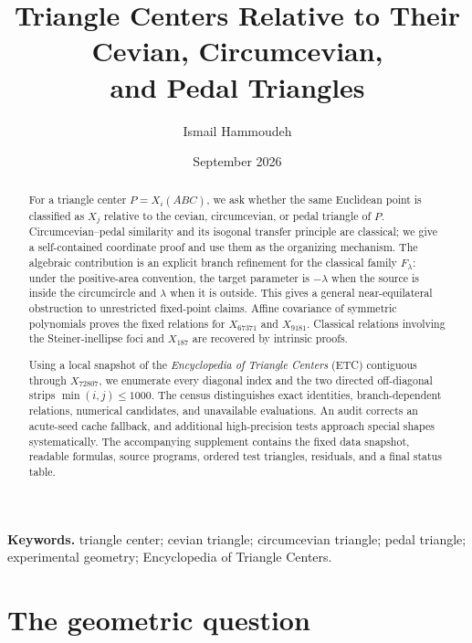 \documentclass[11pt]{article}
\title{Triangle Centers Relative to Their Cevian, Circumcevian,\\
and Pedal Triangles}
\author{Ismail Hammoudeh}
\date{September 2026}
\begin{document}
\maketitle

\begin{abstract}
For a triangle center $P=X_i(ABC)$, we ask whether the same Euclidean point is
classified as $X_j$ relative to the cevian, circumcevian, or pedal triangle
of $P$.  Circumcevian--pedal similarity and its isogonal transfer principle
are classical; we give a self-contained coordinate proof and use them as the
organizing mechanism.  The algebraic contribution is an explicit branch
refinement for the classical family $F_\lambda$: under the positive-area
convention, the target parameter is $-\lambda$ when the source is inside
the circumcircle and $\lambda$ when it is outside.  This gives a general
near-equilateral obstruction to unrestricted fixed-point claims.  Affine
covariance of symmetric polynomials proves the fixed relations for
$X_{67371}$ and $X_{9181}$.  Classical relations involving the
Steiner-inellipse foci and $X_{187}$ are recovered by intrinsic proofs.

Using a local snapshot of the \emph{Encyclopedia of Triangle Centers} (ETC)
contiguous through $X_{72807}$, we enumerate every diagonal index and the two
directed off-diagonal strips $\min(i,j)\leq1000$.  The census distinguishes
exact identities, branch-dependent relations, numerical candidates, and
unavailable evaluations.  An audit corrects an acute-seed cache fallback,
and additional high-precision tests approach special shapes systematically.
The accompanying supplement contains the fixed data snapshot, readable
formulas, source programs, ordered test triangles, residuals, and a final
status table.
\end{abstract}

\noindent\textbf{Keywords.} triangle center; cevian triangle; circumcevian
triangle; pedal triangle; experimental geometry; Encyclopedia of Triangle
Centers.

\section{The geometric question}
\end{document}
